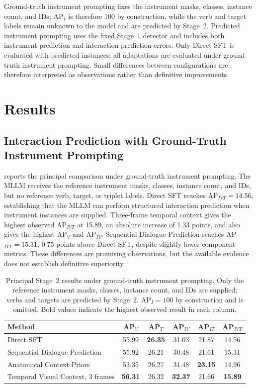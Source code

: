Ground-truth instrument prompting fixes the instrument masks, classes, instance count, and IDs; AP$_I$ is therefore 100 by construction, while the verb and target labels remain unknown to the model and are predicted by Stage~2. Predicted instrument prompting uses the fixed Stage~1 detector and includes both instrument-prediction and interaction-prediction errors. Only Direct SFT is evaluated with predicted instances; all adaptations are evaluated under ground-truth instrument prompting. Small differences between configurations are therefore interpreted as observations rather than definitive improvements.

\section{Results}
\label{sec:c5:results}

\subsection{Interaction Prediction with Ground-Truth Instrument Prompting}

 reports the principal comparison under ground-truth instrument prompting. The MLLM receives the reference instrument masks, classes, instance count, and IDs, but no reference verb, target, or triplet labels. Direct SFT reaches AP$_{IVT}=14.56$, establishing that the MLLM can perform structured interaction prediction when instrument instances are supplied. Three-frame temporal context gives the highest observed AP$_{IVT}$ at 15.89, an absolute increase of 1.33 points, and also gives the highest AP$_V$ and AP$_{IV}$. Sequential Dialogue Prediction reaches AP$_{IVT}=15.31$, 0.75 points above Direct SFT, despite slightly lower component metrics. These differences are promising observations, but the available evidence does not establish definitive superiority.

\begin{table}[htb!]
\centering
\caption{Principal Stage~2 results under ground-truth instrument prompting. Only the reference instrument masks, classes, instance count, and IDs are supplied; verbs and targets are predicted by Stage~2. AP$_I=100$ by construction and is omitted. Bold values indicate the highest observed result in each column.}
\label{tab:c5:principal-adaptations}
\begin{tabular}{lccccc}
\toprule
Method & AP$_V$ & AP$_T$ & AP$_{IV}$ & AP$_{IT}$ & AP$_{IVT}$ \\
\midrule
Direct SFT & 55.99 & \textbf{26.35} & 31.03 & 21.87 & 14.56 \\
Sequential Dialogue Prediction & 55.92 & 26.21 & 30.48 & 21.61 & 15.31 \\
Anatomical Context Priors & 53.35 & 26.27 & 31.48 & \textbf{23.15} & 14.96 \\
Temporal Visual Context, 3 frames & \textbf{56.31} & 26.32 & \textbf{32.37} & 21.66 & \textbf{15.89} \\
\bottomrule
\end{tabular}
\end{table}


